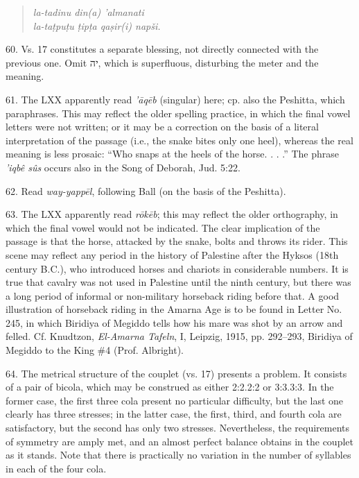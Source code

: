 \begin{enumerate}
\begin{quote}
\emph{la-tadinu \qquad din(a) \qquad 'almanati}\\
\emph{la-taṭpuṭu \qquad ṭipṭa \qquad qaṣir(i) \qquad napši.}
\end{quote}

60. Vs. 17 constitutes a separate blessing, not directly connected with the
previous one. Omit יה, which is superfluous, disturbing the meter and the
meaning.

61. The LXX apparently read \emph{'āqēb} (singular) here; cp. also the
Peshitta, which paraphrases. This may reflect the older spelling practice, in
which the final vowel letters were not written; or it may be a correction on
the basis of a literal interpretation of the passage (i.e., the snake bites
only one heel), whereas the real meaning is less prosaic: ``Who snaps at the
heels of the horse. . . .'' The phrase \emph{'iqbê sûs} occurs also in the
Song of Deborah, Jud. 5:22.

62. Read \emph{way-yappēl}, following Ball (on the basis of the Peshitta).

63. The LXX apparently read \emph{rōkēb}; this may reflect the older
orthography, in which the final vowel would not be indicated. The clear
implication of the passage is that the horse, attacked by the snake, bolts and
throws its rider. This scene may reflect any period in the history of Palestine
after the Hyksos (18th century B.C.), who introduced horses and chariots in
considerable numbers. It is true that cavalry was not used in Palestine until
the ninth century, but there was a long period of informal or non-military
horseback riding before that. A good illustration of horseback riding in the
Amarna Age is to be found in Letter No. 245, in which Biridiya of Megiddo tells
how his mare was shot by an arrow and felled. Cf. Knudtzon, \emph{El-Amarna
Tafeln}, I, Leipzig, 1915, pp. 292--293, Biridiya of Megiddo to the King \#4
(Prof. Albright).

64. The metrical structure of the couplet (vs. 17) presents a problem. It
consists of a pair of bicola, which may be construed as either 2:2.2:2 or
3:3.3:3. In the former case, the first three cola present no particular
difficulty, but the last one clearly has three stresses; in the latter case,
the first, third, and fourth cola are satisfactory, but the second has only two
stresses. Nevertheless, the requirements of symmetry are amply met, and an
almost perfect balance obtains in the couplet as it stands. Note that there is
practically no variation in the number of syllables in each of the four cola.


\end{enumerate}
